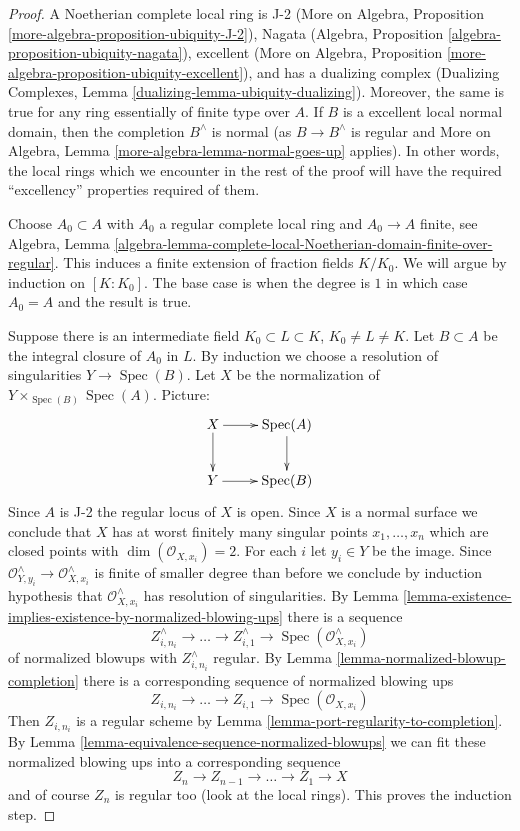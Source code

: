 \documentclass[10pt,a4paper]{amsart}
\theoremstyle{plain}
\theoremstyle{definition}
\theoremstyle{remark}
\numberwithin{equation}{subsection}
\def\Spec{\mathop{\mathrm{Spec}}}
\begin{document}
\begin{proof}
A Noetherian complete local ring is J-2
(More on Algebra, Proposition \ref{more-algebra-proposition-ubiquity-J-2}),
Nagata (Algebra, Proposition \ref{algebra-proposition-ubiquity-nagata}),
excellent (More on Algebra, Proposition
\ref{more-algebra-proposition-ubiquity-excellent}),
and has a dualizing complex
(Dualizing Complexes, Lemma \ref{dualizing-lemma-ubiquity-dualizing}).
Moreover, the same is true for any ring essentially of finite type over $A$.
If $B$ is a excellent local normal domain, then the completion
$B^\wedge$ is normal (as $B \to B^\wedge$ is regular and
More on Algebra, Lemma \ref{more-algebra-lemma-normal-goes-up} applies).
In other words, the local rings which we encounter in the rest of the proof
will have the required ``excellency'' properties required of them.

\medskip\noindent
Choose $A_0 \subset A$ with $A_0$ a regular complete local ring
and $A_0 \to A$ finite, see Algebra, Lemma
\ref{algebra-lemma-complete-local-Noetherian-domain-finite-over-regular}.
This induces a finite extension of fraction fields $K/K_0$.
We will argue by induction on $[K : K_0]$. The base case is
when the degree is $1$ in which case $A_0 = A$ and the result is true.

\medskip\noindent
Suppose there is an intermediate field $K_0 \subset L \subset K$,
$K_0 \not = L \not = K$. Let $B \subset A$ be the integral closure
of $A_0$ in $L$. By induction we choose a resolution of singularities
$Y \to \Spec(B)$. Let $X$ be the normalization
of $Y \times_{\Spec(B)} \Spec(A)$. Picture:
$$
\xymatrix{
X \ar[r] \ar[d] & \Spec(A) \ar[d] \\
Y \ar[r] & \Spec(B)
}
$$
Since $A$ is J-2 the regular locus of $X$ is open. Since $X$
is a normal surface we conclude that $X$ has at worst finitely
many singular points $x_1, \ldots, x_n$ which are closed points with
$\dim(\mathcal{O}_{X, x_i}) = 2$.
For each $i$ let $y_i \in Y$ be the image.
Since
$\mathcal{O}_{Y, y_i}^\wedge \to \mathcal{O}_{X, x_i}^\wedge$
is finite of smaller degree than before we conclude by
induction hypothesis that $\mathcal{O}_{X, x_i}^\wedge$
has resolution of singularities. By
Lemma \ref{lemma-existence-implies-existence-by-normalized-blowing-ups}
there is a sequence
$$
Z^\wedge_{i, n_i} \to \ldots \to Z^\wedge_{i, 1} \to
\Spec(\mathcal{O}_{X, x_i}^\wedge)
$$
of normalized blowups with $Z^\wedge_{i, n_i}$ regular.
By Lemma \ref{lemma-normalized-blowup-completion}
there is a corresponding sequence of normalized blowing ups
$$
Z_{i, n_i} \to \ldots \to Z_{i, 1} \to \Spec(\mathcal{O}_{X, x_i})
$$
Then $Z_{i, n_i}$ is a regular scheme by
Lemma \ref{lemma-port-regularity-to-completion}.
By Lemma \ref{lemma-equivalence-sequence-normalized-blowups}
we can fit these normalized blowing ups
into a corresponding sequence
$$
Z_n \to Z_{n - 1} \to \ldots \to Z_1 \to X
$$
and of course $Z_n$ is regular too (look at the local rings).
This proves the induction step.


\end{proof}
\end{document}

